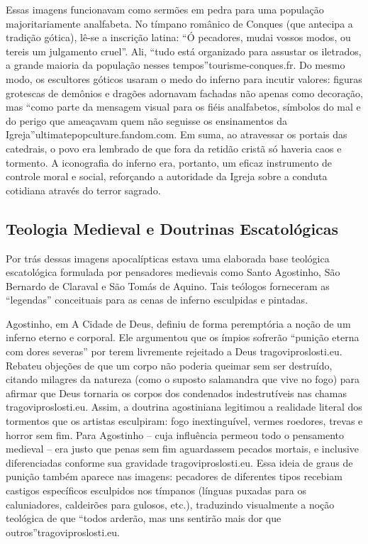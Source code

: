 Essas imagens funcionavam como sermões em pedra para uma população majoritariamente analfabeta. No tímpano românico de Conques (que antecipa a tradição gótica), lê-se a inscrição latina: “Ó pecadores, mudai vossos modos, ou tereis um julgamento cruel”. Ali, “tudo está organizado para assustar os iletrados, a grande maioria da população nesses tempos”tourisme-conques.fr. Do mesmo modo, os escultores góticos usaram o medo do inferno para incutir valores: figuras grotescas de demônios e dragões adornavam fachadas não apenas como decoração, mas “como parte da mensagem visual para os fiéis analfabetos, símbolos do mal e do perigo que ameaçavam quem não seguisse os ensinamentos da Igreja”ultimatepopculture.fandom.com. Em suma, ao atravessar os portais das catedrais, o povo era lembrado de que fora da retidão cristã só haveria caos e tormento. A iconografia do inferno era, portanto, um eficaz instrumento de controle moral e social, reforçando a autoridade da Igreja sobre a conduta cotidiana através do terror sagrado.

\subsection{Teologia Medieval e Doutrinas Escatológicas}

Por trás dessas imagens apocalípticas estava uma elaborada base teológica escatológica formulada por pensadores medievais como Santo Agostinho, São Bernardo de Claraval e São Tomás de Aquino. Tais teólogos forneceram as “legendas” conceituais para as cenas de inferno esculpidas e pintadas.

Agostinho, em A Cidade de Deus, definiu de forma peremptória a noção de um inferno eterno e corporal. Ele argumentou que os ímpios sofrerão “punição eterna com dores severas” por terem livremente rejeitado a Deus tragoviproslosti.eu. Rebateu objeções de que um corpo não poderia queimar sem ser destruído, citando milagres da natureza (como o suposto salamandra que vive no fogo) para afirmar que Deus tornaria os corpos dos condenados indestrutíveis nas chamas tragoviproslosti.eu. Assim, a doutrina agostiniana legitimou a realidade literal dos tormentos que os artistas esculpiram: fogo inextinguível, vermes roedores, trevas e horror sem fim. Para Agostinho -- cuja influência permeou todo o pensamento medieval -- era justo que penas sem fim aguardassem pecados mortais, e inclusive diferenciadas conforme sua gravidade tragoviproslosti.eu. Essa ideia de graus de punição também aparece nas imagens: pecadores de diferentes tipos recebiam castigos específicos esculpidos nos tímpanos (línguas puxadas para os caluniadores, caldeirões para gulosos, etc.), traduzindo visualmente a noção teológica de que “todos arderão, mas uns sentirão mais dor que outros”tragoviproslosti.eu.

